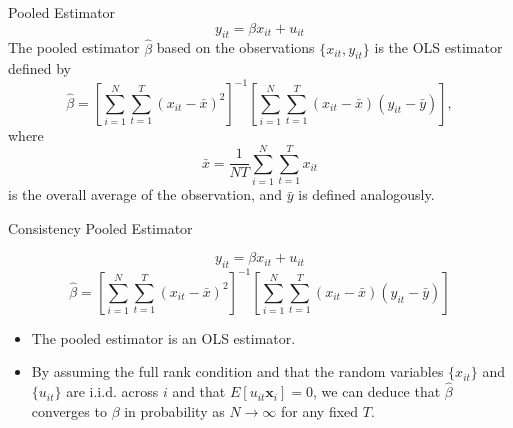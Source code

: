 \documentclass{beamer}
\begin{document}
\begin{frame}{Pooled Estimator}
    {\color{gray}\footnotesize \[
        y_{it}= \beta x_{it}+u_{it}
    \]}
    The pooled estimator $\hat \beta$ based on the observations $\{x_{it}, y_{it}\}$ is the OLS estimator defined by
    \[
        \hat \beta=\left[\sum_{i=1}^N\sum_{t=1}^T(x_{it}-\bar x)^2\right]^{-1}\left[\sum_{i=1}^N\sum_{t=1}^T(x_{it}-\bar x)(y_{it}-\bar y)\right],
    \]
    where
    \[
        \bar x=\frac{1}{NT}\sum_{i=1}^N\sum_{t=1}^T x_{it}
    \]
    is the overall average of the observation, and $\bar y$ is defined analogously.
\end{frame}

\begin{frame}{Consistency Pooled Estimator}
    {\color{gray}\footnotesize
    \[
    y_{it}= \beta x_{it}+u_{it}
    \]
    \[
        \hat \beta=\left[\sum_{i=1}^N\sum_{t=1}^T(x_{it}-\bar x)^2\right]^{-1}\left[\sum_{i=1}^N\sum_{t=1}^T(x_{it}-\bar x)(y_{it}-\bar y)\right]
    \]

    }

    \begin{itemize}
        \item The pooled estimator is an OLS estimator.
        \item By assuming the full rank condition and that the random variables $\{x_{it}\}$ and $\{u_{it}\}$ are i.i.d. across $i$ and that $E[u_{it}\boldsymbol x_i]=0$, we can deduce that $\hat \beta$ converges to $\beta$ in probability as $N \to \infty$ for any fixed $T$.
    \end{itemize}
\end{frame}



\end{document}
